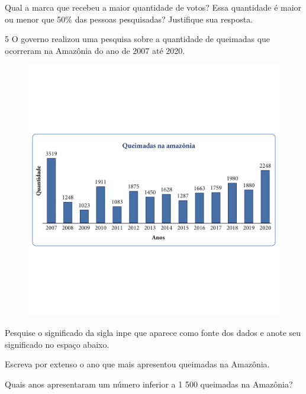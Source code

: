 Qual a marca que recebeu a maior quantidade de votos? Essa quantidade é
maior ou menor que 50\% das pessoas pesquisadas? Justifique sua
resposta.



\num{5} O governo realizou uma pesquisa sobre a quantidade de queimadas que
ocorreram na Amazônia do ano de 2007 até 2020.

\begin{figure}[htpb!]
\includegraphics[width=\textwidth]{../ilustracoes/MAT5/SAEB_5ANO_MAT_figura105.png}
\end{figure}

\begin{escolha}
\item
  Pesquise o significado da sigla inpe que aparece como fonte dos dados
  e anote seu significado no espaço abaixo.


\item
  Escreva por extenso o ano que mais apresentou queimadas na Amazônia.


\item
  Quais anos apresentaram um número inferior a 1 500 queimadas na
  Amazônia?

\end{escolha}

